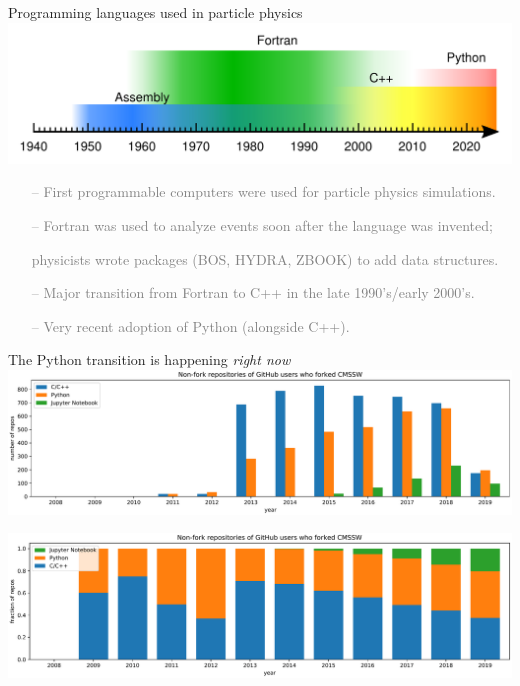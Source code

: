 \documentclass[aspectratio=169]{beamer}
\begin{document}
\begin{frame}{Programming languages used in particle physics}
\large
\vspace{0.5 cm}
\includegraphics[width=\linewidth]{programming-languages.pdf}

\begin{itemize}\setlength{\itemsep}{0.2 cm}
\item[\textcolor{gray}{--}] \textcolor{gray}{First programmable computers were used for particle physics simulations.}
\item[\textcolor{gray}{--}] \textcolor{gray}{Fortran was used to analyze events soon after the language was invented;}

\textcolor{gray}{physicists wrote packages (BOS, HYDRA, ZBOOK) to add data structures.}

\item[\textcolor{gray}{--}] \textcolor{gray}{Major transition from Fortran to C++ in the late 1990's/early 2000's.}
\item[\textcolor{gray}{--}] \textcolor{gray}{Very recent adoption of Python (alongside C++).}
\end{itemize}
\end{frame}

\begin{frame}{The Python transition is happening {\it right now}}
\vspace{0.2 cm}
\includegraphics[width=\linewidth]{github-cmssw-lin.pdf}

\includegraphics[width=\linewidth]{github-cmssw-frac.pdf}
\end{frame}
\end{document}
